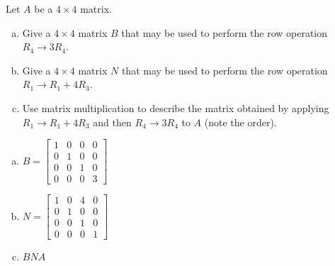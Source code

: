 
\begin{exerciseStatement}


Let \(A\) be a \(4 \times 4\) matrix.


\begin{enumerate}[(a)]
\item Give a \(4 \times 4\) matrix \(B\) that may be used to perform the row operation \( R_4 \to 3R_4 \).
\item Give a \(4 \times 4\) matrix \(N\) that may be used to perform the row operation \( R_1 \to R_1 + 4R_3 \).
\item Use matrix multiplication to describe the matrix obtained by applying \( R_1 \to R_1 + 4R_3 \) and then \( R_4 \to 3R_4 \) to \(A\) (note the order). 
\end{enumerate}
    
\end{exerciseStatement}
    
\begin{exerciseAnswer} 

\begin{enumerate}[(a)]
\item \(B= \left[\begin{array}{cccc}
1 & 0 & 0 & 0 \\
0 & 1 & 0 & 0 \\
0 & 0 & 1 & 0 \\
0 & 0 & 0 & 3
\end{array}\right] \)
\item \(N= \left[\begin{array}{cccc}
1 & 0 & 4 & 0 \\
0 & 1 & 0 & 0 \\
0 & 0 & 1 & 0 \\
0 & 0 & 0 & 1
\end{array}\right] \)
\item \(BNA\)
\end{enumerate}
    
\end{exerciseAnswer}
    
